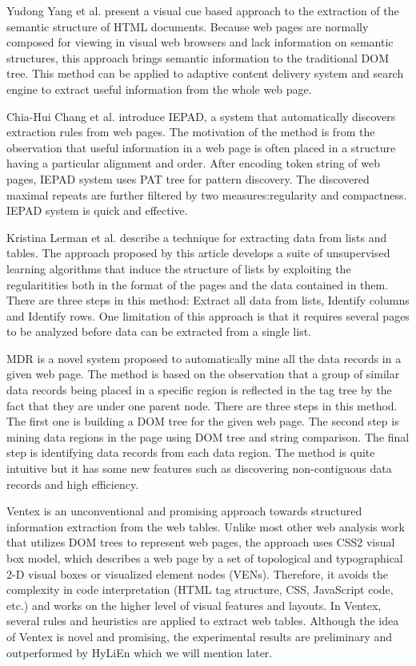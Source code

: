 Yudong Yang et al. \cite{YangZ01:VisualCues} present a visual cue based approach to the extraction of the semantic structure of HTML documents.
Because web pages are normally composed for viewing in visual web browsers and lack information on semantic structures, this approach brings semantic information to the traditional DOM tree.
This method can be applied to adaptive content delivery system and search engine to extract useful information from the whole web page.

Chia-Hui Chang et al. \cite{ChangL01:IEPAD} introduce IEPAD, a system that automatically discovers extraction rules from web pages. The motivation of the method is from the observation that useful information in a web page is often placed in a structure having a particular alignment and order. After encoding token string of web pages, IEPAD system uses PAT tree for pattern discovery. The discovered maximal repeats are further filtered by two measures:regularity and compactness. IEPAD system is quick and effective.

Kristina Lerman et al.\cite{Lerman01:AutomaticData} describe a technique for extracting data from lists and tables. The approach proposed by this article develops a suite of unsupervised learning algorithms that induce the structure of lists by exploiting the regularitities both in the format of the pages and the data contained in them. There are three steps in this method: Extract all data from lists, Identify columns and Identify rows. One limitation of this approach is that it requires several pages to be analyzed before data can be extracted from a single list.

MDR \cite{LiuGZ03:MDR} is a novel system proposed to automatically mine all the data records in a given web page. The method is based on the observation that a group of similar data records being placed in a specific region is reflected in the tag tree by the fact that they are under one parent node. There are three steps in this method. The first one is building a DOM tree for the given web page. The second step is mining data regions in the page using DOM tree and string comparison. The final step is identifying data records from each data region. The method is quite intuitive but it  has some new features such as discovering non-contiguous data records and high efficiency.

Ventex\cite{GatterbauerBHKP2007:Towards} is
an unconventional and promising approach towards
structured information extraction from the web tables.
Unlike most other web analysis work that utilizes DOM trees to represent web pages,
the approach uses CSS2 visual box model\cite{CCS2Box},
which describes a web page by a set of topological and typographical 2-D visual boxes
or visualized element nodes (VENs).
Therefore, it avoids the complexity in code interpretation
(HTML tag structure, CSS, JavaScript code, etc.)
and works on the higher level of visual features and layouts.
In Ventex, several rules and heuristics are applied to extract web tables.
Although the idea of Ventex is novel and promising,
the experimental results are preliminary and outperformed by HyLiEn \cite{FumarolaWBMH11:List}
which we will mention later.


